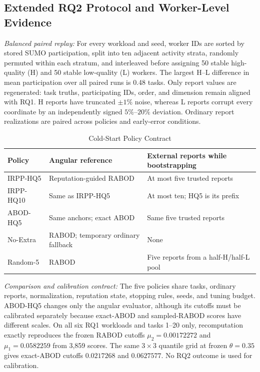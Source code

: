 \documentclass[journal]{IEEEtran}
\begin{document}
\FloatBarrier
\subsection{Extended RQ2 Protocol and Worker-Level Evidence}
\label{sec:supp-rq2}

\textit{Balanced paired replay:}
For every workload and seed, worker IDs are sorted by stored SUMO participation,
split into ten adjacent activity strata, randomly permuted within each stratum,
and interleaved before assigning 50 stable high-quality (H) and 50 stable
low-quality (L) workers. The largest H--L difference in mean participation over
all paired runs is 0.48 tasks. Only report values are regenerated: task truths,
participating IDs, order, and dimension remain aligned with RQ1. H reports have
truncated $\pm1\%$ noise, whereas L reports corrupt every coordinate by an
independently signed $5\%$--$20\%$ deviation. Ordinary report realizations are
paired across policies and early-error conditions.

\begin{table}[!t]
\centering
\caption{Cold-Start Policy Contract}
\label{tab:supp-rq2-policies}
\scriptsize
\setlength{\tabcolsep}{2.3pt}
\renewcommand{\arraystretch}{1.05}
\begin{tabularx}{\columnwidth}{@{}lXX@{}}
\toprule
Policy & Angular reference & External reports while bootstrapping \\
\midrule
IRPP-HQ5 & Reputation-guided RABOD & At most five trusted reports \\
IRPP-HQ10 & Same as IRPP-HQ5 & At most ten; HQ5 is its prefix \\
ABOD-HQ5 & Same anchors; exact ABOD & Same five trusted reports \\
No-Extra & RABOD; temporary ordinary fallback & None \\
Random-5 & RABOD & Five reports from a half-H/half-L pool \\
\bottomrule
\end{tabularx}
\end{table}

\textit{Comparison and calibration contract:}
The five policies share tasks, ordinary reports, normalization, reputation
state, stopping rules, seeds, and tuning budget. ABOD-HQ5 changes only the
angular evaluator, although its cutoffs must be calibrated separately because
exact-ABOD and sampled-RABOD scores have different scales. On all six RQ1
workloads and tasks 1--20 only, recomputation exactly reproduces the frozen
RABOD cutoffs $\mu_2=0.00172272$ and $\mu_1=0.0582259$ from 3,859 scores. The
same $3\times3$ quantile grid at frozen $\theta=0.35$ gives exact-ABOD cutoffs
$0.0217268$ and $0.0627577$. No RQ2 outcome is used for calibration.
\end{document}
